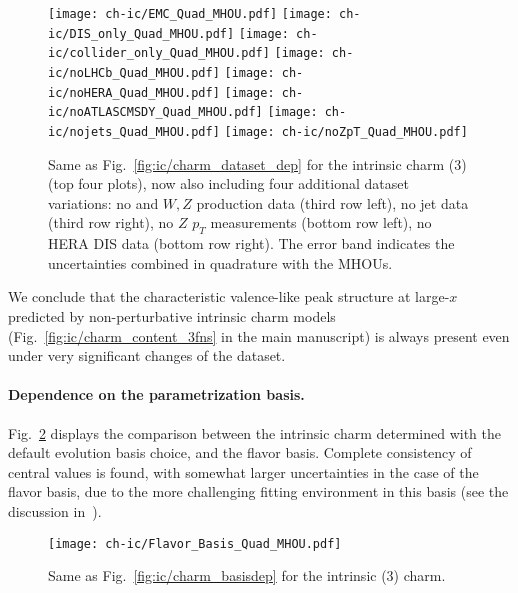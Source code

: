 \begin{figure}[h]
  \begin{center}
    \texttt{[image: ch-ic/EMC\_Quad\_MHOU.pdf]}
    \texttt{[image: ch-ic/DIS\_only\_Quad\_MHOU.pdf]}
    \texttt{[image: ch-ic/collider\_only\_Quad\_MHOU.pdf]}
    \texttt{[image: ch-ic/noLHCb\_Quad\_MHOU.pdf]}
    \texttt{[image: ch-ic/noHERA\_Quad\_MHOU.pdf]}
    \texttt{[image: ch-ic/noATLASCMSDY\_Quad\_MHOU.pdf]}
    \texttt{[image: ch-ic/nojets\_Quad\_MHOU.pdf]}
    \texttt{[image: ch-ic/noZpT\_Quad\_MHOU.pdf]}
    \caption{\small Same as Fig.~\ref{fig:ic/charm_dataset_dep}
      for the intrinsic charm (3\fns) \pdf (top four plots), now also including
      four additional dataset variations:  no \atlas and \cms $W, Z$
      production data   (third row left),
      no jet data (third row right), no $Z$ $p_T$
      measurements (bottom row left), no HERA
      DIS data (bottom row right).
The error band indicates the \pdf uncertainties combined in quadrature with the MHOUs.
\label{fig:ic/charm_dataset_dep_nf3} }
\end{center}
\end{figure}

We conclude that
the characteristic valence-like peak structure at large-$x$
predicted by non-perturbative intrinsic charm models (Fig.~\ref{fig:ic/charm_content_3fns}
in the main manuscript)
is always present even under very significant changes of the dataset.
%

\paragraph{Dependence on the parametrization basis.}
%
Fig.~\ref{fig:ic/charm_basisdep_3FNS} displays
the comparison between the intrinsic charm
\pdf determined with the default evolution basis choice, and the flavor
basis. Complete consistency of central values is found, with somewhat
larger uncertainties in the case of the flavor basis, due to the more 
challenging fitting environment in this basis (see the discussion in~\cite{Ball:2021leu}).

\begin{figure}[t!]
  \begin{center}
    \texttt{[image: ch-ic/Flavor\_Basis\_Quad\_MHOU.pdf]}
    \caption{\small Same as Fig.~\ref{fig:ic/charm_basisdep}
    for the intrinsic (3\fns) charm.
  \label{fig:ic/charm_basisdep_3FNS} }
\end{center}
\end{figure}


